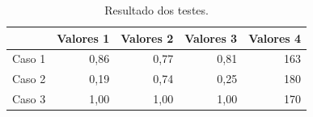 \begin{table}[!htb]
    \centering
    \caption{Resultado dos testes.}
    \label{tab_testes}
    \begin{tabular}{rrrrr}
        \toprule
               & Valores 1 & Valores 2 & Valores 3 & Valores 4 \\
        \midrule
        Caso 1 & 0,86      & 0,77      & 0,81      & 163       \\
        Caso 2 & 0,19      & 0,74      & 0,25      & 180       \\
        Caso 3 & 1,00      & 1,00      & 1,00      & 170       \\
        \bottomrule
    \end{tabular}
\end{table}
